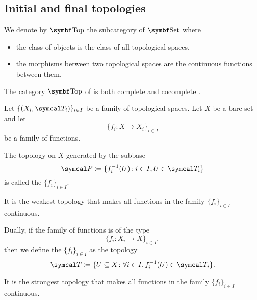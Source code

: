 \subsection{Initial and final topologies}\label{subsec:initial_final_topologies}

\begin{definition}\label{def:category_of_topological_spaces}
  We denote by \( \Cat{Top} \) the subcategory of \( \Bold{Set} \) where
  \begin{itemize}
    \item the class of objects is the class of all topological spaces.
    \item the morphisms between two topological spaces are the continuous functions between them.
  \end{itemize}
\end{definition}

\begin{theorem}\label{thm:top_complete_cocomplete}
  The category \( \Cat{Top} \) of is both complete  and cocomplete .
\end{theorem}

\begin{definition}\label{def:initial_topology}\cite{nLab:top}
  Let \( \{ (X_i, \Cal{T}_i) \}_{i \in I} \) be a family of topological spaces. Let \( X \) be a bare set and let
  \begin{equation*}
    \{ f_i: X \to X_i \}_{i \in I}
  \end{equation*}
  be a family of functions.

  The topology on \( X \) generated by the subbase
  \begin{equation*}
    \Cal{P} \coloneqq \{ f_i^{-1}(U) \colon i \in I, U \in \Cal{T}_i \}
  \end{equation*}
  is called the  \( \{ f_i \}_{i \in I} \).

  It is the weakest topology that makes all functions in the family \( \{ f_i \}_{i \in I} \) continuous.
\end{definition}

\begin{definition}\label{def:final_topology}\cite{nLab:top}
  Dually, if the family of functions is of the type
  \begin{equation*}
    \{ f_i: X_i \to X \}_{i \in I},
  \end{equation*}
  then we define the  \( \{ f_i \}_{i \in I} \) as the topology
  \begin{equation*}
    \Cal{T} \coloneqq \{ U \subseteq X \colon \forall i \in I, f_i^{-1}(U) \in \Cal{T}_i \}.
  \end{equation*}

  It is the strongest topology that makes all functions in the family \( \{ f_i \}_{i \in I} \) continuous.
\end{definition}

